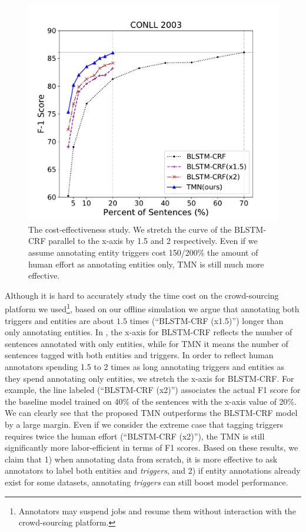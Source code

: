 \begin{figure}[h]
\centering
	\includegraphics[width=0.8\linewidth]{LatexDiss/figures/singlelabelefficiency.pdf}
	\caption{ The cost-effectiveness study. We stretch the curve of the BLSTM-CRF parallel to the x-axis by 1.5 and 2 respectively. Even if we assume annotating  entity triggers cost 150/200\% the amount of human effort as annotating entities only, TMN is still much more effective. }
	\label{fig:curve}
\end{figure}

Although it is hard to accurately study the time cost on the crowd-sourcing platform we used\footnote{Annotators may suspend jobs and resume them without interaction with the crowd-sourcing platform.}, based on our offline simulation we argue that annotating both triggers and entities are about $1.5$ times (``BLSTM-CRF (x1.5)'') longer than only annotating entities.
In , the x-axis for BLSTM-CRF reflects the number of sentences annotated with only entities, while for TMN it means the number of sentences tagged with both entities and triggers. 
In order to reflect human annotators spending 1.5 to 2 times as long annotating triggers and entities as they spend annotating only entities, we stretch the x-axis for BLSTM-CRF. For example, the line labeled (``BLSTM-CRF (x2)'') associates the actual F1 score for the baseline model trained on 40\% of the sentences with the x-axis value of 20\%. 
We can clearly see that the proposed TMN outperforms the BLSTM-CRF model by a large margin. 
Even if we consider the extreme case that tagging triggers requires twice the human effort (``BLSTM-CRF (x2)''), the TMN is still significantly more labor-efficient in terms of F1 scores. Based on these results, we claim that 1) when annotating data from scratch, it is more effective to ask annotators to label both entities and \textit{triggers}, and 2) if entity annotations already exist for some datasets, annotating \textit{triggers} can still boost model performance.


